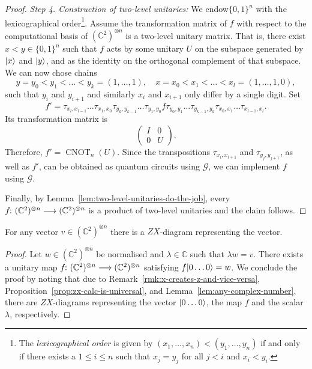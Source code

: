 \documentclass[a4paper, oneside, 12pt]{amsart}
\DeclareMathOperator{\CNOT}{CNOT}
\begin{document}
\begin{proof}
  \noindent
  \textit{Step 4. Construction of two-level unitaries:}
  We endow\( \{0,1\}^n \) with the lexicographical order\footnote{
    The \emph{lexicographical order} is given by \((x_{1}, \dots , x_{n})< (y_{1}, \dots , y_{n})\) if and only if there exists a \(1\leq i \leq n \) such that \(x_{j}=y_{j}\) for all \(j<i\) and \(x_{i}<y_{i}\).
  }.
  Assume the transformation matrix of \( f \) with respect to the computational basis of \( (\mathbb{C}^2)^{\otimes n} \) is a two-level unitary matrix. That is, there exist \( x < y \in \{0,1\}^n \) such that \( f \) acts by some unitary \( U \) on the subspace generated by \( \lvert x\rangle \) and \( \lvert y\rangle \), and as the identity on the orthogonal complement of that subspace.
  We can now chose chains
  \begin{equation*}
    y = y_0 < y_1 < \dots < y_k = (1, \dots, 1), \quad x = x_0 < x_1 < \dots < x_l = (1, \dots, 1, 0),
  \end{equation*}
  such that \( y_i \) and \( y_{i+1} \) and similarly \( x_{i} \) and \(x_{i+1}\) only differ by a single digit.
  Set
  \begin{equation*}
    f' = \tau_{x_l, x_{l-1}} \dots \tau_{x_1, x_0} \tau_{y_k, y_{k-1}} \dots \tau_{y_1, y_0} f \tau_{y_0, y_1} \dots \tau_{y_{k-1}, y_k} \tau_{x_0, x_1} \dots \tau_{x_{l-1}, x_l}.
  \end{equation*}
  Its transformation matrix is
  \begin{equation*}
    \begin{pmatrix}
      I & 0 \\
      0 & U
    \end{pmatrix}.
  \end{equation*}
  Therefore, \( f' = \CNOT_n(U) \).
  Since the transpositions \( \tau_{x_i, x_{i+1}} \) and \( \tau_{y_j, y_{j+1}} \), as well as \( f' \), can be obtained as quantum circuits using \( \mathcal{G} \), we can implement \( f \) using \( \mathcal{G} \).

  Finally, by Lemma~\ref{lem:two-level-unitaries-do-the-job},  every \(f \from ( \mathbb{C}^{2})^{\otimes n} \to ( \mathbb{C}^{2})^{\otimes n}\) is a product of two-level unitaries and the claim follows.
\end{proof}

\begin{lemma}\label{lem:generate-vectors-using-zx-calculus}
  For any vector \(v \in ( \mathbb{C}^{2})^{ \otimes n}\) there is a \(ZX\)-diagram representing the vector.
\end{lemma}
\begin{proof}
  Let \(w \in ( \mathbb{C}^{2})^{\otimes n}\) be normalised and \(\lambda \in \mathbb{C}\) such that \(\lambda w= v\).
  There exists a unitary map \(f\from ( \mathbb{C}^{2})^{ \otimes n} \to ( \mathbb{C}^{2})^{ \otimes n}\) satisfying \( f\lvert0 \dots 0\rangle = w\).
  We conclude the proof by noting that due to Remark~\ref{rmk:x-creates-z-and-vice-versa}, Proposition~\ref{prop:zx-calc-is-universal}, and Lemma~\ref{lem:any-complex-number}, there are \(ZX\)-diagrams representing  the vector \(\lvert0 \dots 0\rangle\), the map \(f\) and the scalar \(\lambda\), respectively.
\end{proof}
\end{document}
